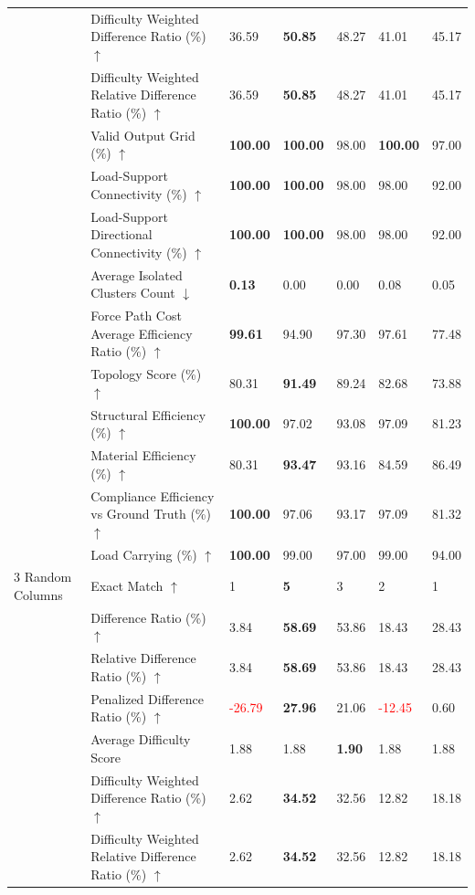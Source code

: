 \begin{table}[!h]
{\begin{tabular}{lllllll}
 & Difficulty Weighted Difference Ratio (\%) $\uparrow$ & 36.59 & \textbf{50.85} & 48.27 & 41.01 & 45.17 \\
 & Difficulty Weighted Relative Difference Ratio (\%) $\uparrow$ & 36.59 & \textbf{50.85} & 48.27 & 41.01 & 45.17 \\
 & Valid Output Grid (\%) $\uparrow$ & \textbf{100.00} & \textbf{100.00} & 98.00 & \textbf{100.00} & 97.00 \\
 & Load-Support Connectivity (\%) $\uparrow$ & \textbf{100.00} & \textbf{100.00} & 98.00 & 98.00 & 92.00 \\
 & Load-Support Directional Connectivity (\%) $\uparrow$ & \textbf{100.00} & \textbf{100.00} & 98.00 & 98.00 & 92.00 \\
 & Average Isolated Clusters Count $\downarrow$ & \textbf{0.13} & 0.00 & 0.00 & 0.08 & 0.05 \\
 & Force Path Cost Average Efficiency Ratio (\%) $\uparrow$ & \textbf{99.61} & 94.90 & 97.30 & 97.61 & 77.48 \\
 & Topology Score (\%) $\uparrow$ & 80.31 & \textbf{91.49} & 89.24 & 82.68 & 73.88 \\
 & Structural Efficiency (\%) $\uparrow$ & \textbf{100.00} & 97.02 & 93.08 & 97.09 & 81.23 \\
 & Material Efficiency (\%) $\uparrow$ & 80.31 & \textbf{93.47} & 93.16 & 84.59 & 86.49 \\
 & Compliance Efficiency vs Ground Truth (\%) $\uparrow$ & \textbf{100.00} & 97.06 & 93.17 & 97.09 & 81.32 \\
 & Load Carrying (\%) $\uparrow$ & \textbf{100.00} & 99.00 & 97.00 & 99.00 & 94.00 \\
3 Random Columns & Exact Match $\uparrow$ & 1 & \textbf{5} & 3 & 2 & 1 \\
 & Difference Ratio (\%) $\uparrow$ & 3.84 & \textbf{58.69} & 53.86 & 18.43 & 28.43 \\
 & Relative Difference Ratio (\%) $\uparrow$ & 3.84 & \textbf{58.69} & 53.86 & 18.43 & 28.43 \\
 & Penalized Difference Ratio (\%) $\uparrow$ & \textcolor{red}{-26.79} & \textbf{27.96} & 21.06 & \textcolor{red}{-12.45} & 0.60 \\
 & Average Difficulty Score & 1.88 & 1.88 & \textbf{1.90} & 1.88 & 1.88 \\
 & Difficulty Weighted Difference Ratio (\%) $\uparrow$ & 2.62 & \textbf{34.52} & 32.56 & 12.82 & 18.18 \\
 & Difficulty Weighted Relative Difference Ratio (\%) $\uparrow$ & 2.62 & \textbf{34.52} & 32.56 & 12.82 & 18.18 \\

\end{tabular}}
\end{table}
